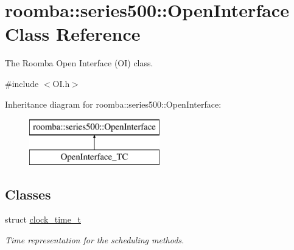 \hypertarget{classroomba_1_1series500_1_1_open_interface}{\section{roomba\+:\+:series500\+:\+:Open\+Interface Class Reference}
\label{classroomba_1_1series500_1_1_open_interface}
}


The Roomba Open Interface (O\+I) class.  




{\ttfamily \#include $<$O\+I.\+h$>$}

Inheritance diagram for roomba\+:\+:series500\+:\+:Open\+Interface\+:\begin{figure}[H]
\begin{center}
\leavevmode
\includegraphics[height=2.000000cm]{classroomba_1_1series500_1_1_open_interface}
\end{center}
\end{figure}
\subsection*{Classes}
\begin{DoxyCompactItemize}
\item 
struct \hyperlink{structroomba_1_1series500_1_1_open_interface_1_1clock__time__t}{clock\+\_\+time\+\_\+t}
\begin{DoxyCompactList}\small\item\em Time representation for the scheduling methods. \end{DoxyCompactList}\end{DoxyCompactItemize}
